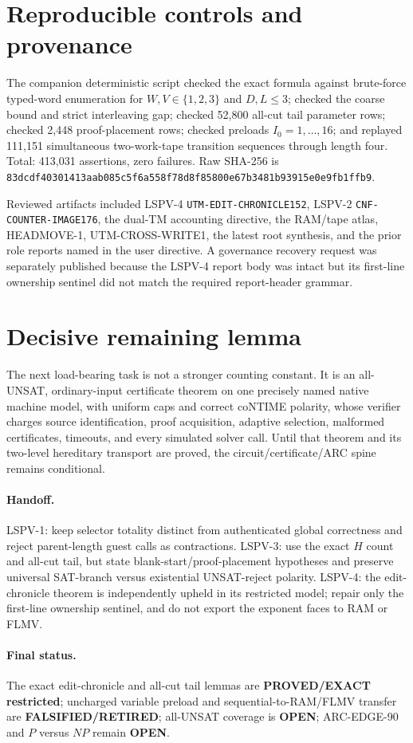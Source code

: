 \documentclass[11pt]{article}
\begin{document}
\section{Reproducible controls and provenance}

The companion deterministic script checked the exact formula against brute-force typed-word enumeration for $W,V\in\{1,2,3\}$ and $D,L\le3$; checked the coarse bound and strict interleaving gap; checked 52,800 all-cut tail parameter rows; checked 2,448 proof-placement rows; checked preloads $I_0=1,\dots,16$; and replayed 111,151 simultaneous two-work-tape transition sequences through length four.  Total: 413,031 assertions, zero failures.  Raw SHA-256 is
\texttt{83dcdf40301413aab085c5f6a558f78d8f85800e67b3481b93915e0e9fb1ffb9}.

Reviewed artifacts included LSPV-4 \texttt{UTM-EDIT-CHRONICLE152}, LSPV-2 \texttt{CNF-COUNTER-IMAGE176}, the dual-TM accounting directive, the RAM/tape atlas, HEADMOVE-1, UTM-CROSS-WRITE1, the latest root synthesis, and the prior role reports named in the user directive.  A governance recovery request was separately published because the LSPV-4 report body was intact but its first-line ownership sentinel did not match the required report-header grammar.

\section{Decisive remaining lemma}

The next load-bearing task is not a stronger counting constant.  It is an all-UNSAT, ordinary-input certificate theorem on one precisely named native machine model, with uniform caps and correct coNTIME polarity, whose verifier charges source identification, proof acquisition, adaptive selection, malformed certificates, timeouts, and every simulated solver call.  Until that theorem and its two-level hereditary transport are proved, the circuit/certificate/ARC spine remains conditional.

\paragraph{Handoff.}
LSPV-1: keep selector totality distinct from authenticated global correctness and reject parent-length guest calls as contractions.  LSPV-3: use the exact $H$ count and all-cut tail, but state blank-start/proof-placement hypotheses and preserve universal SAT-branch versus existential UNSAT-reject polarity.  LSPV-4: the edit-chronicle theorem is independently upheld in its restricted model; repair only the first-line ownership sentinel, and do not export the exponent faces to RAM or FLMV.

\paragraph{Final status.}
The exact edit-chronicle and all-cut tail lemmas are \textbf{PROVED/EXACT restricted}; uncharged variable preload and sequential-to-RAM/FLMV transfer are \textbf{FALSIFIED/RETIRED}; all-UNSAT coverage is \textbf{OPEN}; ARC-EDGE-90 and $P$ versus $NP$ remain \textbf{OPEN}.
\end{document}
